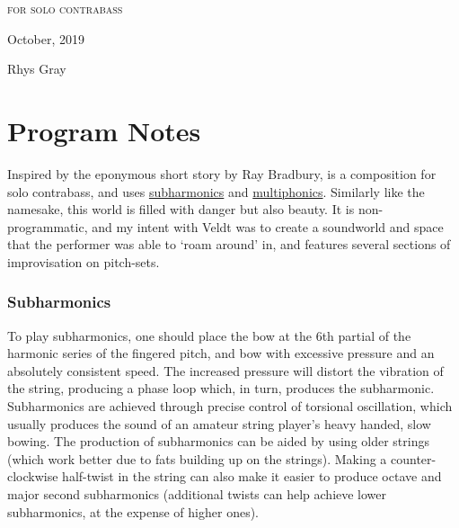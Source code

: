 
\invisiblechapter{\bassPiece}

\vspace*{3cm}
\begin{center}
\textsc{for solo contrabass}

\vspace*{3.5cm}

\HRule{0.5pt}


\LARGE \textbf{\uppercase{\bassPiece}}
\HRule{2pt}

\vspace{1.3cm}

\normalsize October, 2019
\date{}

\vspace*{5\baselineskip}

Rhys Gray

\end{center}
\newpage
\newpage

\section*{Program Notes}
Inspired by the eponymous short story by Ray Bradbury, \bassPiece\space is a composition for solo contrabass, and uses \hyperref[sec:subharmonics]{subharmonics} and \hyperref[sec:multiphonics]{multiphonics}. 
Similarly like the namesake, this world is filled with danger but also beauty. 
It is non-programmatic, and my intent with Veldt was to create a soundworld and space that the performer was able to `roam around' in, and features several sections of improvisation on pitch-sets.

\subsubsection*{Subharmonics}
To play subharmonics, one should place the bow at the 6th partial of the harmonic series of the fingered pitch, and bow with excessive pressure and an absolutely consistent speed. 
The increased pressure will distort the vibration of the string, producing a phase loop which, in turn, produces the subharmonic. 
Subharmonics are achieved through precise control of torsional oscillation, which usually produces the sound of an amateur string player's heavy handed, slow bowing. 
The production of subharmonics can be aided by using older strings (which work better due to fats building up on the strings). 
Making a counter-clockwise half-twist in the string can also make it easier to produce octave and major second subharmonics (additional twists can help achieve lower subharmonics, at the expense of higher ones).

